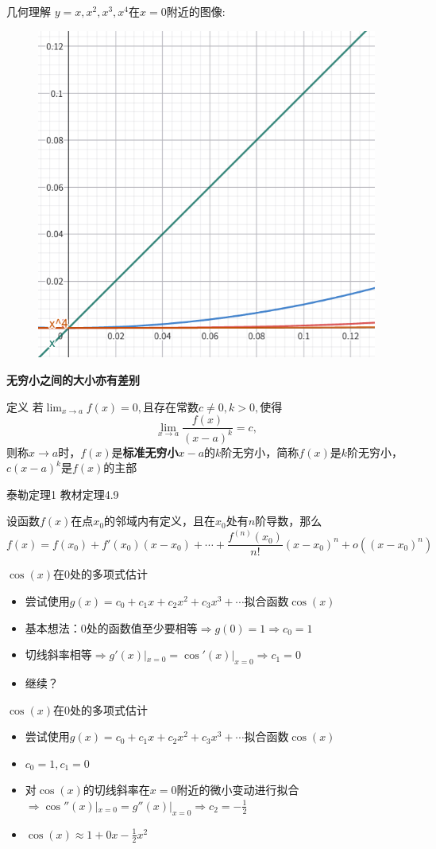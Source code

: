 \documentclass[]{beamer}
\begin{document}
\begin{frame}{几何理解}
    $y=x,x^2,x^3,x^4$在$x=0$附近的图像:
    \begin{figure}[H]
        \centering
        \includegraphics[width=0.45\linewidth]{infi.png}
    \end{figure}
    \textbf{无穷小之间的大小亦有差别}
\end{frame}

\begin{frame}{定义}
    若$\displaystyle\lim_{x\rightarrow a}f(x)=0,$且存在常数$c\ne0,k>0,$使得
    \[
    \lim_{x\rightarrow a}\frac{f(x)}{(x-a)^k}=c,
    \]
    则称$x\rightarrow a$时，$f(x)$是\textbf{标准无穷小}$x-a$的$k$阶无穷小，简称$f(x)$是$k$阶无穷小，$c(x-a)^k$是$f(x)$的主部
\end{frame}

\begin{frame}{泰勒定理1}
教材定理4.9

设函数$f(x)$在点$x_0$的邻域内有定义，且在$x_0$处有$n$阶导数，那么
\[
f(x)=f(x_0)+f'(x_0)(x-x_0)+\cdots+\frac{f^{(n)}(x_0)}{n!}(x-x_0)^n+o((x-x_0)^n)
\]    
\end{frame}

\begin{frame}{$\cos(x)$在$0$处的多项式估计}
    \begin{itemize}
        \item 尝试使用$g(x)=c_0+c_1x+c_2x^2+c_3x^3+\cdots$拟合函数$\cos(x)$
        \item 基本想法：$0$处的函数值至少要相等$\Rightarrow g(0)=1\Rightarrow c_0=1$
        \item 切线斜率相等$\Rightarrow g'(x)|_{x=0}=\cos'(x)|_{x=0} \Rightarrow c_1 = 0$
        \item 继续？
    \end{itemize}
\end{frame}

\begin{frame}{$\cos(x)$在$0$处的多项式估计}
    \begin{itemize}
        \item 尝试使用$g(x)=c_0+c_1x+c_2x^2+c_3x^3+\cdots$拟合函数$\cos(x)$
        \item $c_0=1,c_1=0$
        \item 对$\cos(x)$的切线斜率在$x=0$附近的微小变动进行拟合
        \\ $\Rightarrow \cos''(x)|_{x=0} = g''(x)|_{x=0} \Rightarrow c_2 = -\frac12$ 
        \item $\cos(x) \approx 1 + 0x - \frac12x^2$
    \end{itemize}
\end{frame}
\end{document}

